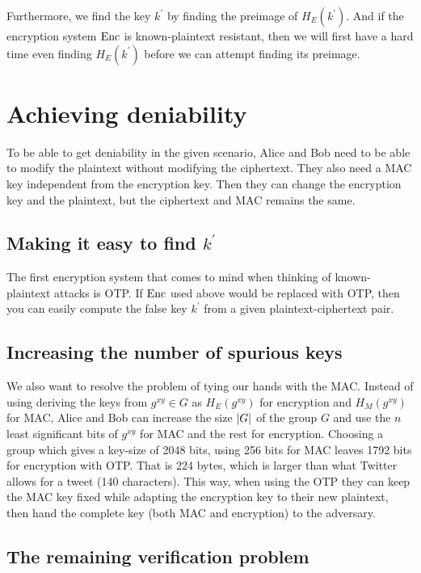 Furthermore, we find the key \(k^\prime\) by finding the preimage of \(H_E( 
k^\prime )\).
And if the encryption system \(\operatorname{\mathrm{Enc}}\) is known-plaintext resistant, then we 
will first have a hard time even finding \(H_E( k^\prime )\) before we can 
attempt finding its preimage.


\section{Achieving deniability}

To be able to get deniability in the given scenario, Alice and Bob need to be 
able to modify the plaintext without modifying the ciphertext.
They also need a \ac{MAC} key independent from the encryption key.
Then they can change the encryption key and the plaintext, but the ciphertext 
and \ac{MAC} remains the same.

\subsection{Making it easy to find \(k^\prime\)}

The first encryption system that comes to mind when thinking of known-plaintext 
attacks is \ac{OTP}.
If \(\operatorname{\mathrm{Enc}}\) used above would be replaced with \ac{OTP}, then you can easily 
compute the false key \(k^\prime\) from a given plaintext-ciphertext pair.

\subsection{Increasing the number of spurious keys}

We also want to resolve the problem of tying our hands with the \ac{MAC}.
Instead of using deriving the keys from \(g^{xy}\in G\) as \(H_E(g^{xy})\) for 
encryption and \(H_M(g^{xy})\) for \ac{MAC}, Alice and Bob can increase the 
size \(|G|\) of the group \(G\) and use the \(n\) least significant bits of 
\(g^{xy}\) for \ac{MAC} and the rest for encryption.
Choosing a group which gives a key-size of 2048 bits, using 256 bits for 
\ac{MAC} leaves 1792 bits for encryption with \ac{OTP}.
That is 224 bytes, which is larger than what Twitter allows for a tweet (140 
characters).
This way, when using the \ac{OTP} they can keep the \ac{MAC} key fixed while 
adapting the encryption key to their new plaintext, then hand the complete key 
(both \ac{MAC} and encryption) to the adversary.

\subsection{The remaining verification problem}

